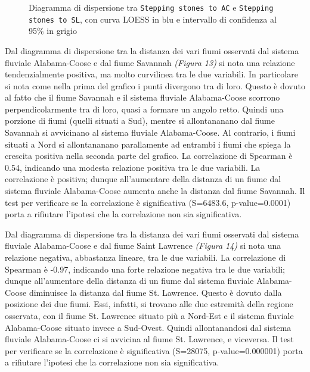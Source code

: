 \documentclass{article} %
\begin{document}
\begin{figure}[H]
\begin{minipage}{0.49\textwidth}
        \captionsetup{justification=centering}
        \caption{Diagramma di dispersione tra \texttt{Stepping stones to AC} e \texttt{Stepping stones to SL}, con curva LOESS in blu e intervallo di confidenza al 95\% in grigio}
    \end{minipage}
\end{figure}

Dal diagramma di dispersione tra la distanza dei vari fiumi osservati dal sistema fluviale Alabama-Coose e dal fiume Savannah \textit{(Figura 13)} si nota una relazione tendenzialmente positiva, ma molto curvilinea tra le due variabili. 
In particolare si nota come nella prima del grafico i punti divergono tra di loro. Questo è dovuto al fatto che il fiume Savannah e il sistema fluviale Alabama-Coose scorrono perpendicolarmente tra di loro, quasi a formare un angolo retto. Quindi una porzione di fiumi (quelli situati a Sud), mentre si allontananano dal fiume Savannah si avvicinano al sistema fluviale Alabama-Coose. Al contrario, i fiumi situati a Nord si allontananano parallamente ad entrambi i fiumi che spiega la crescita positiva nella seconda parte del grafico.
La correlazione di Spearman è 0.54, indicando una modesta relazione positiva tra le due variabili. La correlazione è positiva; dunque all'aumentare della distanza di un fiume dal sistema fluviale Alabama-Coose aumenta anche la distanza dal fiume Savannah. 
Il test per verificare se la correlazione è significativa (S=6483.6, p-value=0.0001) porta a rifiutare l'ipotesi che la correlazione non sia significativa.

Dal diagramma di dispersione tra la distanza dei vari fiumi osservati dal sistema fluviale Alabama-Coose e dal fiume Saint Lawrence \textit{(Figura 14)} si nota una relazione negativa, abbastanza lineare, tra le due variabili.  
La correlazione di Spearman è -0.97, indicando una forte relazione negativa tra le due variabili; dunque all'aumentare della distanza di un fiume dal sistema fluviale Alabama-Coose diminuisce la distanza dal fiume St. Lawrence. 
Questo è dovuto dalla posizione dei due fiumi. Essi, infatti, si trovano alle due estremità della regione osservata, con il fiume St. Lawrence situato più a Nord-Est e il sistema fluviale Alabama-Coose situato invece a Sud-Ovest. Quindi allontanandosi dal sistema fluviale Alabama-Coose ci si avvicina al fiume St. Lawrence, e viceversa.
Il test per verificare se la correlazione è significativa (S=28075, p-value=0.000001) porta a rifiutare l'ipotesi che la correlazione non sia significativa.
\end{document}
